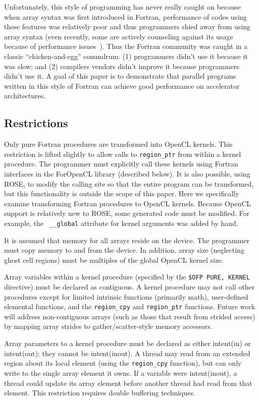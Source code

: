Unfortunately, this style of programming has never really caught on because when
array syntax was first introduced in Fortran, performance of codes using these features was
relatively poor and thus programmers shied away from using array syntax (even
recently, some are actively counseling against its usage because of performance
issues~\cite{Levesque:SC08}).  Thus the Fortran community was caught in a
classic ``chicken-and-egg'' conundrum: (1) programmers didn't use it because it
was slow; and (2) compilers vendors didn't improve it because programmers didn't
use it.  A goal of this paper is to demonstrate that parallel programs written
in this style of Fortran can achieve good performance on accelerator architectures.

\subsection{Restrictions}

Only pure Fortran procedures are transformed into OpenCL kernels.  This restriction
is lifted slightly to allow calls to {\tt region\_ptr} from within a kernel procedure.  The
programmer must explicitly call these kernels using Fortran interfaces in the ForOpenCL
library (described below).  It is also possible, using ROSE, to modify the calling
site so that the entire program can be transformed, but this functionality is
outside the scope of this paper.  Here we specifically examine transforming
Fortran procedures to OpenCL kernels.  Because OpenCL support is relatively new
to ROSE, some generated code must be modified.  For example, the {\tt
  \_\_global} attribute for kernel arguments was added by hand.

It is assumed that memory for all arrays reside on the device.  The programmer
must copy memory to and from the device.  In addition, array size (neglecting
ghost cell regions) must be multiples of the global OpenCL kernel size.

Array variables within a kernel procedure (specified by the {\tt \!\$OFP PURE,
  KERNEL} directive) must be declared as contiguous.  A kernel procedure may not
call other procedures except for limited intrinsic functions (primarily math),
user-defined elemental functions, and the {\tt region\_cpy} and {\tt region\_ptr}
functions.  Future work will address non-contiguous arrays (such as those that
result from strided access) by mapping array strides to gather/scatter-style
memory accessors.

Array parameters to a kernel procedure must be declared as either intent(in) or
intent(out); they cannot be intent(inout).  A thread may read from an extended
region about its local element (using the {\tt region\_cpy} function), but can
only write to the single array element it owns.  If a variable were intent(inout),
a thread could update its array element before another thread had read from that
element.  This restriction requires double buffering techniques.
